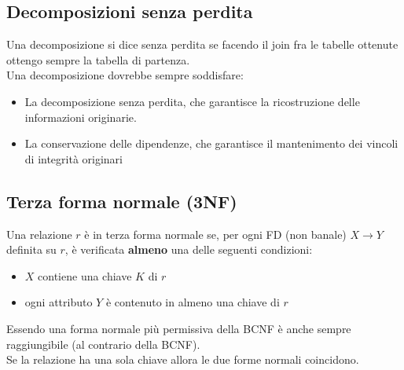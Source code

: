 \subsection{Decomposizioni senza perdita}
Una decomposizione si dice senza perdita se facendo il join fra le tabelle ottenute ottengo sempre la tabella di partenza.\\
Una decomposizione dovrebbe sempre soddisfare:
\begin{itemize}
    \item La decomposizione senza perdita, che garantisce la ricostruzione delle informazioni originarie.
    \item La conservazione delle dipendenze, che garantisce il mantenimento dei vincoli di integrità originari
\end{itemize}

\subsection{Terza forma normale (3NF)}
Una relazione $r$ \`e in terza forma normale se, per ogni FD (non banale) $X \rightarrow Y$ definita su $r$, \`e verificata \textbf{almeno} una delle seguenti condizioni:
\begin{itemize}
    \item $X$ contiene una chiave $K$ di $r$
    \item ogni attributo $Y$ \`e contenuto in almeno una chiave di $r$
\end{itemize}
Essendo una forma normale più permissiva della BCNF \`e anche sempre raggiungibile (al contrario della BCNF).
\vspace{6mm} \\
Se la relazione ha una sola chiave allora le due forme normali coincidono.